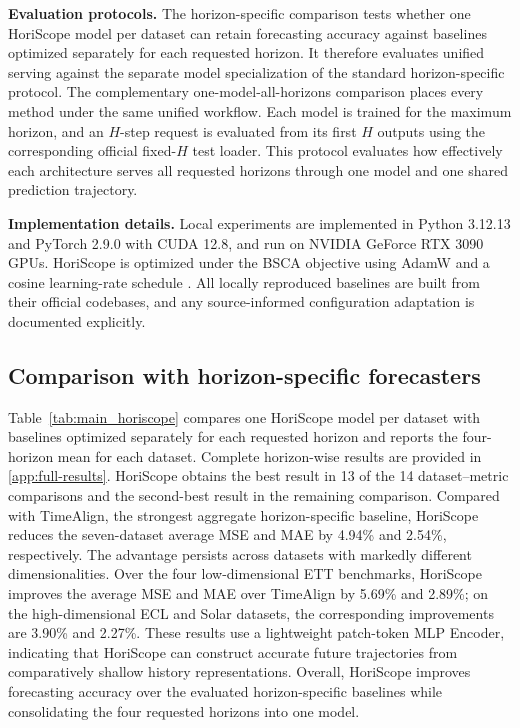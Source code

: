 \textbf{Evaluation protocols.} The horizon-specific comparison tests whether one HoriScope model per dataset can retain forecasting accuracy against baselines optimized separately for each requested horizon. It therefore evaluates unified serving against the separate model specialization of the standard horizon-specific protocol. The complementary one-model-all-horizons comparison places every method under the same unified workflow. Each model is trained for the maximum horizon, and an $H$-step request is evaluated from its first $H$ outputs using the corresponding official fixed-$H$ test loader. This protocol evaluates how effectively each architecture serves all requested horizons through one model and one shared prediction trajectory.

\textbf{Implementation details.} Local experiments are implemented in Python 3.12.13 and PyTorch 2.9.0 with CUDA 12.8, and run on NVIDIA GeForce RTX 3090 GPUs. HoriScope is optimized under the BSCA objective using AdamW and a cosine learning-rate schedule \citep{loshchilov2019adamw,loshchilov2017sgdr}. All locally reproduced baselines are built from their official codebases, and any source-informed configuration adaptation is documented explicitly.

\subsection{Comparison with horizon-specific forecasters}
\label{sec:horizon-specific-comparison}





Table~\ref{tab:main_horiscope} compares one HoriScope model per dataset with baselines optimized separately for each requested horizon and reports the four-horizon mean for each dataset. Complete horizon-wise results are provided in \ref{app:full-results}. HoriScope obtains the best result in 13 of the 14 dataset--metric comparisons and the second-best result in the remaining comparison. Compared with TimeAlign, the strongest aggregate horizon-specific baseline, HoriScope reduces the seven-dataset average MSE and MAE by 4.94\% and 2.54\%, respectively. The advantage persists across datasets with markedly different dimensionalities. Over the four low-dimensional ETT benchmarks, HoriScope improves the average MSE and MAE over TimeAlign by 5.69\% and 2.89\%; on the high-dimensional ECL and Solar datasets, the corresponding improvements are 3.90\% and 2.27\%. These results use a lightweight patch-token MLP Encoder, indicating that HoriScope can construct accurate future trajectories from comparatively shallow history representations. Overall, HoriScope improves forecasting accuracy over the evaluated horizon-specific baselines while consolidating the four requested horizons into one model.

